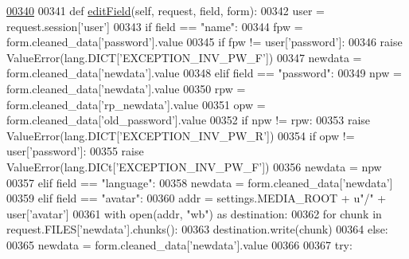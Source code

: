 \begin{DoxyCode}
\hypertarget{classProfile_1_1ProfileUnit_1_1BusProfile_l00340}{}\hyperlink{classProfile_1_1ProfileUnit_1_1BusProfile_a5c116d007081ffefcc1c45cd34c88e10}{00340} 
00341     \textcolor{keyword}{def }\hyperlink{classProfile_1_1ProfileUnit_1_1BusProfile_a5c116d007081ffefcc1c45cd34c88e10}{editField}(self, request, field, form):
00342         user = request.session[\textcolor{stringliteral}{'user'}]
00343         \textcolor{keywordflow}{if} field == \textcolor{stringliteral}{"name"}:
00344             fpw = form.cleaned\_data[\textcolor{stringliteral}{'password'}].value
00345             \textcolor{keywordflow}{if} fpw != user[\textcolor{stringliteral}{'password'}]:
00346                 \textcolor{keywordflow}{raise} ValueError(lang.DICT[\textcolor{stringliteral}{'EXCEPTION\_INV\_PW\_F'}])
00347             newdata = form.cleaned\_data[\textcolor{stringliteral}{'newdata'}].value
00348         \textcolor{keywordflow}{elif} field == \textcolor{stringliteral}{"password"}:
00349             npw = form.cleaned\_data[\textcolor{stringliteral}{'newdata'}].value
00350             rpw = form.cleaned\_data[\textcolor{stringliteral}{'rp\_newdata'}].value
00351             opw = form.cleaned\_data[\textcolor{stringliteral}{'old\_password'}].value
00352             \textcolor{keywordflow}{if} npw != rpw:
00353                 \textcolor{keywordflow}{raise} ValueError(lang.DICT[\textcolor{stringliteral}{'EXCEPTION\_INV\_PW\_R'}])
00354             \textcolor{keywordflow}{if} opw != user[\textcolor{stringliteral}{'password'}]:
00355                 \textcolor{keywordflow}{raise} ValueError(lang.DICt[\textcolor{stringliteral}{'EXCEPTION\_INV\_PW\_F'}])
00356             newdata = npw
00357         \textcolor{keywordflow}{elif} field == \textcolor{stringliteral}{"language"}:
00358             newdata = form.cleaned\_data[\textcolor{stringliteral}{'newdata'}]
00359         \textcolor{keywordflow}{elif} field == \textcolor{stringliteral}{"avatar"}:
00360             addr = settings.MEDIA\_ROOT + \textcolor{stringliteral}{u"/"} + user[\textcolor{stringliteral}{'avatar'}]
00361             with open(addr, \textcolor{stringliteral}{"wb"}) \textcolor{keyword}{as} destination:
00362                     \textcolor{keywordflow}{for} chunk \textcolor{keywordflow}{in} request.FILES[\textcolor{stringliteral}{'newdata'}].chunks():
00363                         destination.write(chunk)
00364         \textcolor{keywordflow}{else}:
00365             newdata = form.cleaned\_data[\textcolor{stringliteral}{'newdata'}].value
00366 
00367         \textcolor{keywordflow}{try}:

\end{DoxyCode}
